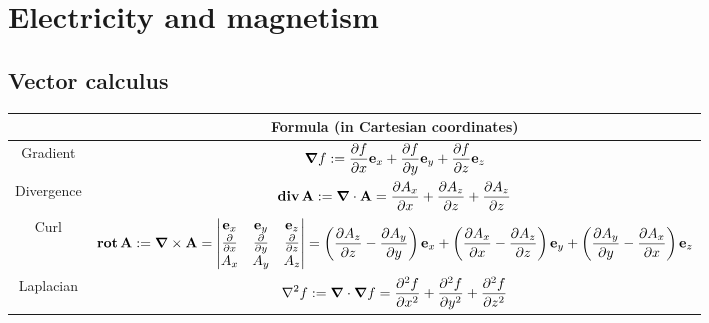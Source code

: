 \documentclass[../../../main.tex]{subfiles}
\begin{document}
\section{Electricity and magnetism}
\subsection{Vector calculus}
\begin{center}
  \begin{tabular}{|c|c|}

    \hline
               & Formula (in Cartesian coordinates)                                                                                                                                                                                                                                                                                                                                        \\
    \hline
    Gradient   & $\displaystyle\grad f:=\frac{\partial f}{\partial x}\vb{e}_x+\frac{\partial f}{\partial y}\vb{e}_y+\frac{\partial f}{\partial z}\vb{e}_z$                                                                                                                                                                                                            \\
    \hline
    Divergence & $\displaystyle\operatorname{\vb{div}} \vb{A}:=\grad\cdot\vb{A}=\frac{\partial A_x}{\partial x}+\frac{\partial A_z}{\partial z}+\frac{\partial A_z}{\partial z}$                                                                                                                                                                                                                \\
    \hline
    Curl       & $\displaystyle\operatorname{\vb{rot}} \vb{A}:=\grad\times\vb{A}=\begin{vmatrix}
        \vb{e}_x             & \vb{e}_y             & \vb{e}_z             \\
        \frac{\partial}{\partial x} & \frac{\partial}{\partial y} & \frac{\partial}{\partial z} \\
        A_x                         & A_y                         & A_z                         \\
      \end{vmatrix}=\left(\frac{\partial A_z}{\partial z}-\frac{\partial A_y}{\partial y}\right)\vb{e}_x+\left(\frac{\partial A_x}{\partial x}-\frac{\partial A_z}{\partial z}\right)\vb{e}_y+\left(\frac{\partial A_y}{\partial y}-\frac{\partial A_x}{\partial x}\right)\vb{e}_z$ \\
    \hline
    Laplacian  & $\displaystyle\laplacian f:=\grad\cdot\grad f=\frac{\partial^2f}{\partial x^2}+\frac{\partial^2f}{\partial y^2}+\frac{\partial^2f}{\partial z^2}$                                                                                                                                                                                                                         \\
    \hline
  \end{tabular}
\end{center}
\end{document}
